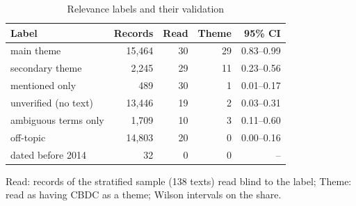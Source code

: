 \begin{table}[htbp]
\centering\small
\caption{Relevance labels and their validation}\label{tab:relevance}
\begin{tabular}{@{}lrrrr@{}}
\toprule
\textbf{Label} & \textbf{Records} & \textbf{Read} & \textbf{Theme} & \textbf{95\% CI} \\
\midrule
main theme & 15,464 & 30 & 29 & 0.83--0.99 \\
secondary theme & 2,245 & 29 & 11 & 0.23--0.56 \\
mentioned only & 489 & 30 & 1 & 0.01--0.17 \\
unverified (no text) & 13,446 & 19 & 2 & 0.03--0.31 \\
ambiguous terms only & 1,709 & 10 & 3 & 0.11--0.60 \\
off-topic & 14,803 & 20 & 0 & 0.00--0.16 \\
dated before 2014 & 32 & 0 & 0 & -- \\
\bottomrule
\end{tabular}
\par\smallskip\parbox{0.92\linewidth}{\footnotesize Read: records of the stratified sample (138 texts) read blind to the label; Theme: read as having CBDC as a theme; Wilson intervals on the share.}
\end{table}

